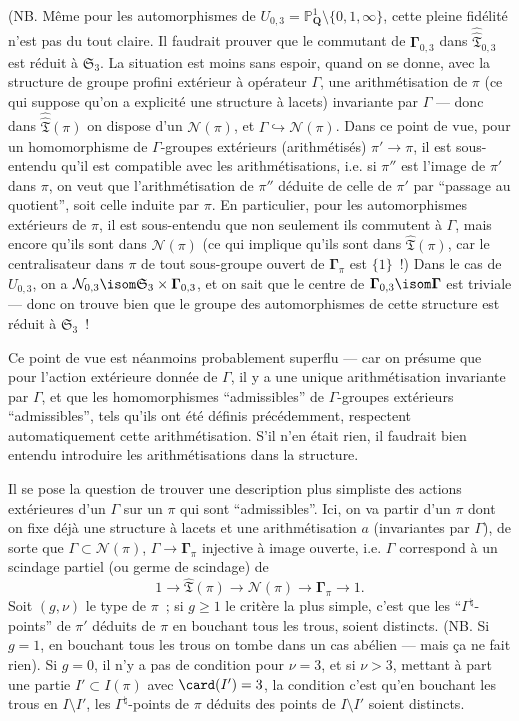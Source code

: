 (NB. Même pour les automorphismes de $U_{0,3}=\mathbb{P}^1_{{\mathbf{Q}}}\setminus\{0,1,\infty\}$, cette pleine fidélité n'est pas du tout claire.  Il faudrait prouver que le commutant de $\boldsymbol{\Gamma}_{0,3}$ dans $\hat{\hat{\mathfrak{T}}}_{0,3}$ est réduit à $\mathfrak{S}_3$.  La situation est moins sans espoir, quand on se donne, avec la structure de groupe profini extérieur à opérateur $\Gamma$, une arithmétisation de $\pi$ (ce qui suppose qu'on a explicité une structure à lacets) invariante par $\Gamma$ --- donc dans $\hat{\hat{\mathfrak{T}}}(\pi)$ on dispose d'un $\mathcal{N}(\pi)$, et $\Gamma\hookrightarrow \mathcal{N}(\pi)$. Dans ce point de vue, pour un homomorphisme de $\Gamma$-groupes extérieurs (arithmétisés) $\pi'\to\pi$, il est sous-entendu qu'il est compatible avec les arithmétisations, i.e. si $\pi''$ est l'image de $\pi'$ dans $\pi$, on veut que l'arithmétisation de $\pi''$ déduite de celle de $\pi'$ par ``passage au quotient'', soit celle induite par $\pi$. En particulier, pour les automorphismes extérieurs de $\pi$, il est sous-entendu que non seulement ils commutent à $\Gamma$, mais encore qu'ils sont dans $\mathcal{N}(\pi)$ (ce qui implique qu'ils sont dans $\hat{\mathfrak{T}}(\pi)$, car le centralisateur dans $\pi$ de tout sous-groupe ouvert de $\boldsymbol{\Gamma}_\pi$ est $\{1\}$~!) Dans le cas de $U_{0,3}$, on a $\mathcal{N}_{0,3} \isom \mathfrak{S}_3\times\boldsymbol{\Gamma}_{0,3}$, et on sait que le centre de $\boldsymbol{\Gamma}_{0,3} \isom \boldsymbol{\Gamma}$ est triviale --- donc on trouve bien que le groupe des automorphismes de cette structure est réduit à $\mathfrak{S}_3$~!

Ce point de vue est néanmoins probablement superflu --- car on présume que pour l'action extérieure donnée de $\Gamma$, il y a une unique arithmétisation invariante par $\Gamma$, et que les homomorphismes ``admissibles'' de $\Gamma$-groupes extérieurs ``admissibles'', tels qu'ils ont été définis précédemment, respectent automatiquement cette arithmétisation. S'il n'en était rien, il faudrait bien entendu introduire les arithmétisations dans la structure.

Il se pose la question de trouver une description plus simpliste des actions extérieures d'un $\Gamma$ sur un $\pi$ qui sont ``admissibles''. Ici, on va partir d'un $\pi$ dont on fixe déjà une structure à lacets et une arithmétisation $a$ (invariantes par $\Gamma$), de sorte que $\Gamma\subset \mathcal{N}(\pi)$, $\Gamma\to\boldsymbol{\Gamma}_\pi$ injective à image ouverte, i.e. $\Gamma$ correspond à un scindage partiel (ou germe de scindage) de
$$
1\to \hat{\mathfrak{T}}(\pi)\to \mathcal{N}(\pi)\to
\boldsymbol{\Gamma}_\pi\to 1.
$$
Soit $(g,\nu)$ le type de $\pi$~; si $g\ge 1$ le critère la plus simple, c'est que les ``$\Gamma^\natural$-points'' de $\pi'$ déduits de $\pi$ en bouchant tous les trous, soient distincts. (NB. Si $g=1$, en bouchant tous les trous on tombe dans un cas abélien --- mais \c ca ne fait rien). Si $g=0$, il n'y a pas de condition pour $\nu=3$, et si $\nu>3$, mettant à part une partie $I'\subset  I(\pi)$ avec $\card(I')=3$, la condition c'est qu'en bouchant les trous en $I\setminus I'$, les $\Gamma^\natural$-points de $\pi$ déduits des points de $I\setminus I'$ soient distincts.

